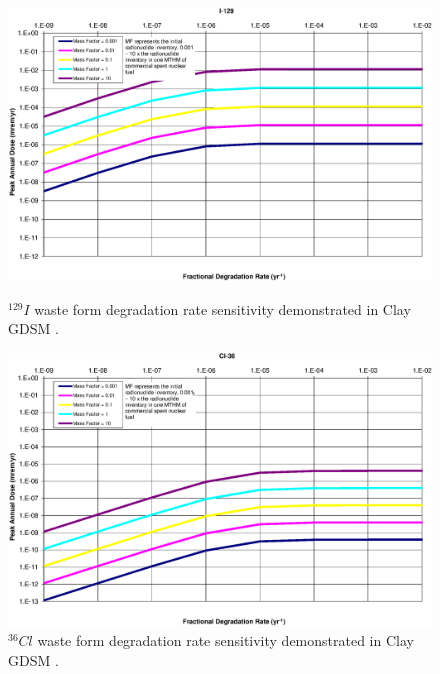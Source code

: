\begin{figure}[ht!]
\begin{minipage}[b]{0.45\linewidth}
\centering
\includegraphics[width=\linewidth]{./results/images/WFDegAndInv/I-129.eps}
\caption{$^{129}I$ waste form degradation rate sensitivity demonstrated in Clay 
        GDSM \cite{huff_key_2012}.}
\label{fig:WFDegI129}

\end{minipage}
\hspace{0.05\linewidth}
\begin{minipage}[b]{0.45\linewidth}

\includegraphics[width=\linewidth]{./results/images/WFDegAndInv/Cl-36.eps}
\caption{$^{36}Cl$ waste form degradation rate sensitivity demonstrated in Clay 
        GDSM \cite{huff_key_2012}.}
\label{fig:WFDegCl36}
\end{minipage}
\end{figure}

\FloatBarrier
